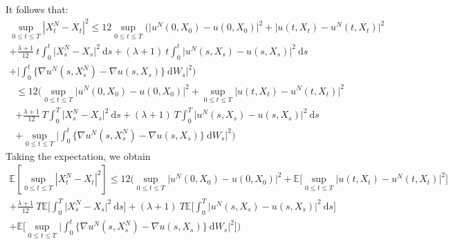 \documentclass{article}[12pt]
\newcommand{\E}{\mathbb{E}}
\newcommand{\di}{\mathrm{d}}
\begin{document}
        It follows that:
        \begin{multline*}
        \underset{0\leq t\leq T}{\sup}\left|X^{N}_t-X_t\right|^2\leq 12\underset{0\leq t\leq T}{\sup}\Bigg(\Big|u^N(0,X_0) - u(0,X_0)\Big|^2 + \Big|u(t,X_t) - u^N(t,X_t)\Big|^2 \\ + \frac{\lambda+1}{12}\ t\int_0^t \big|X_s^N- X_s\big|^2\ \di s + (\lambda+1)\ t\int_0^t \big|u^N(s,X_s) - u(s,X_s)\big|^2\ \di s \\+ \bigg|\int_0^t \{\nabla u^N(s,X_s^N) - \nabla u(s,X_s)\}\ \di W_s\bigg|^2 \Bigg)
        \end{multline*}
        \begin{multline*}
        \leq 12\Bigg(\underset{0\leq t\leq T}{\sup}\Big|u^N(0,X_0) - u(0,X_0)\Big|^2 + \underset{0\leq t\leq T}{\sup}\Big|u(t,X_t) - u^N(t,X_t)\Big|^2 \\ + \frac{\lambda+1}{12}\ T\int_0^T \big|X_s^N- X_s\big|^2\ \di s + (\lambda+1)\ T\int_0^T \big|u^N(s,X_s) - u(s,X_s)\big|^2\ \di s \\+ \underset{0\leq t\leq T}{\sup}\bigg|\int_0^t \{\nabla u^N(s,X_s^N) - \nabla u(s,X_s)\}\ \di W_s\bigg|^2 \Bigg)
        \end{multline*}
        Taking the expectation, we obtain
        \begin{multline*}
        \E\left[\underset{0\leq t\leq T}{\sup}\left|X^{N}_t-X_t\right|^2\right] \leq 12\Bigg(\underset{0\leq t\leq T}{\sup}\Big|u^N(0,X_0) - u(0,X_0)\Big|^2 + \E\bigg[\underset{0\leq t\leq T}{\sup}\Big|u(t,X_t) - u^N(t,X_t)\Big|^2\bigg] \\ + \frac{\lambda+1}{12}\ T\E\bigg[\int_0^T \big|X_s^N- X_s\big|^2\ \di s\bigg] + (\lambda+1)\ T\E\bigg[\int_0^T \big|u^N(s,X_s) - u(s,X_s)\big|^2\ \di s\bigg] \\+\E\bigg[ \underset{0\leq t\leq T}{\sup}\bigg|\int_0^t \{\nabla u^N(s,X_s^N) - \nabla u(s,X_s)\}\ \di W_s\bigg|^2 \bigg]\Bigg)
        \end{multline*}
        
        
       


    
\end{document}

